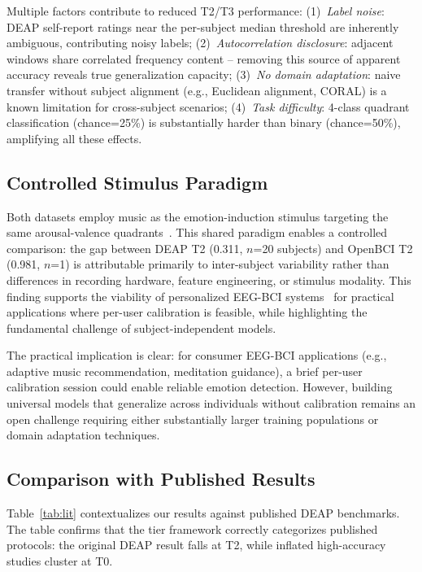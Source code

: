 \documentclass[a4paper, 10pt, conference]{ieeeconf}
\begin{document}
Multiple factors contribute to reduced T2/T3 performance: (1)~\emph{Label noise}: DEAP self-report ratings near the per-subject median threshold are inherently ambiguous, contributing noisy labels; (2)~\emph{Autocorrelation disclosure}: adjacent windows share correlated frequency content -- removing this source of apparent accuracy reveals true generalization capacity; (3)~\emph{No domain adaptation}: naive transfer without subject alignment (e.g., Euclidean alignment, CORAL) is a known limitation for cross-subject scenarios; (4)~\emph{Task difficulty}: 4-class quadrant classification (chance=25\%) is substantially harder than binary (chance=50\%), amplifying all these effects.

\subsection{Controlled Stimulus Paradigm}

Both datasets employ music as the emotion-induction stimulus targeting the same arousal-valence quadrants~\cite{russell1980}. This shared paradigm enables a controlled comparison: the gap between DEAP T2 (0.311, $n$=20 subjects) and OpenBCI T2 (0.981, $n$=1) is attributable primarily to inter-subject variability rather than differences in recording hardware, feature engineering, or stimulus modality. This finding supports the viability of personalized EEG-BCI systems~\cite{lotte2018} for practical applications where per-user calibration is feasible, while highlighting the fundamental challenge of subject-independent models.

The practical implication is clear: for consumer EEG-BCI applications (e.g., adaptive music recommendation, meditation guidance), a brief per-user calibration session could enable reliable emotion detection. However, building universal models that generalize across individuals without calibration remains an open challenge requiring either substantially larger training populations or domain adaptation techniques.

\subsection{Comparison with Published Results}

Table~\ref{tab:lit} contextualizes our results against published DEAP benchmarks. The table confirms that the tier framework correctly categorizes published protocols: the original DEAP result falls at T2, while inflated high-accuracy studies cluster at T0.
\end{document}
